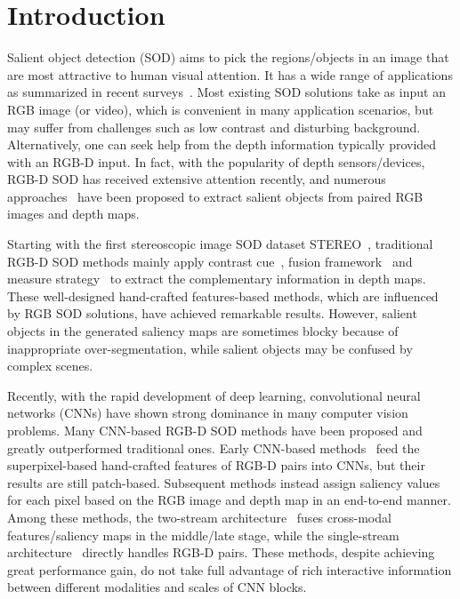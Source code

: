 \documentclass[runningheads]{llncs}
\begin{document}
\section{Introduction}
Salient object detection (SOD) aims to pick the regions/objects in an image that are most attractive
to human visual attention.
It has a wide range of applications as summarized in recent
surveys~\cite{2015SODBenchmark,Borji2019,2019sodsurvey}.
Most existing SOD solutions take as input an RGB image (or video), which is convenient in many
application scenarios, but may suffer from challenges such as low contrast and disturbing background.
Alternatively, one can seek help from the depth information typically provided with an RGB-D input.
In fact, with the popularity of depth sensors/devices, RGB-D SOD has received extensive attention recently,
and numerous
approaches~\cite{Niu2012STEREO,Li2014LFSD,Feng2016LBE,Song2017MDSF,Qu2017DF,Han2018CTMF,Chen2018PCF,Zhao2019CPFP,Cong2019DTM,Fan2019D3Net}
have been proposed to extract salient objects from paired RGB images and depth maps.




Starting with the first stereoscopic image SOD dataset STEREO~\cite{Niu2012STEREO},
traditional RGB-D SOD methods mainly apply contrast
cue~\cite{Fang2014TIP,Fan2014DSP,SHK2015Saliency},
fusion framework~\cite{Peng2014NLPR,Guo2015Salient,Song2017MDSF,2017MBD} and
measure strategy~\cite{Li2014LFSD,Cong2016SPL,Feng2016LBE} to
extract the complementary information in depth maps.
These well-designed hand-crafted features-based methods,
which are influenced by RGB SOD solutions, have achieved remarkable results.
However, salient objects in the generated saliency maps are
sometimes blocky because of inappropriate over-segmentation, while salient objects may be confused by complex scenes.




Recently, with the rapid development of deep learning,
convolutional neural networks (CNNs) have shown strong dominance
in many computer vision problems.
Many CNN-based RGB-D SOD methods have been proposed and greatly outperformed traditional ones.
Early CNN-based methods~\cite{Qu2017DF,Shigematsu2017ICCVW}
feed the superpixel-based hand-crafted features of RGB-D pairs into CNNs,
but their results are still patch-based.
Subsequent methods instead assign saliency values for each pixel based
on the RGB image and depth map in an end-to-end manner.
Among these methods, the two-stream
architecture~\cite{Han2018CTMF,Chen2018PCF,Wang2019AFNet,Chen2019MMCI,Ding2019JVCIR,2019PDNet}
fuses cross-modal features/saliency maps in the middle/late stage,
while the single-stream architecture~\cite{Liu2019SRCNN,Fan2019D3Net}
directly handles RGB-D pairs.
These methods, despite achieving great performance gain, do not take full advantage of rich interactive information between different modalities and scales of CNN blocks. 
\end{document}

